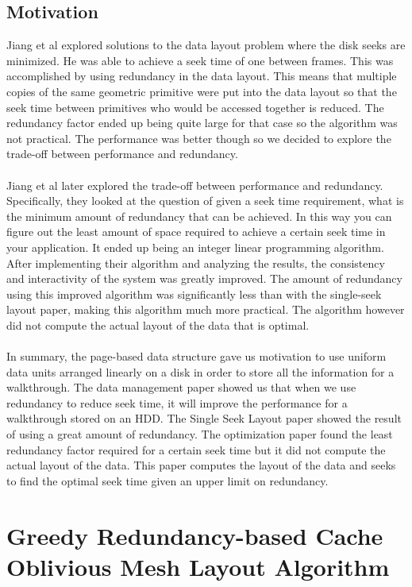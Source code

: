 \documentclass[11pt,psfig]{article}
\begin{document}
\subsection*{Motivation}

Jiang et al \cite{singleseeklayout} explored solutions to the data layout problem where the disk seeks are minimized. He was able to achieve a seek time of one between frames. This was accomplished by using redundancy in the data layout. This means that multiple copies of the same geometric primitive were put into the data layout so that the seek time between primitives who would be accessed together is reduced. The redundancy factor ended up being quite large for that case so the algorithm was not practical. The performance was better though so we decided to explore the trade-off between performance and redundancy. \\
\\
Jiang et al \cite{optimizingredundancy} later explored the trade-off between performance and redundancy. Specifically, they looked at the question of given a seek time requirement, what is the minimum amount of redundancy that can be achieved. In this way you can figure out the least amount of space required to achieve a certain seek time in your application. It ended up being an integer linear programming algorithm. After implementing their algorithm and analyzing the results, the consistency and interactivity of the system was greatly improved. The amount of redundancy using this improved algorithm was significantly less than with the single-seek layout paper, making this algorithm much more practical. The algorithm however did not compute the actual layout of the data that is optimal. \\
\\
In summary, the page-based data structure gave us motivation to use uniform data units arranged linearly on a disk in order to store all the information for a walkthrough. The data management paper showed us that when we use redundancy to reduce seek time, it will improve the performance for a walkthrough stored on an HDD. The Single Seek Layout paper showed the result of using a great amount of redundancy. The optimization paper found the least redundancy factor required for a certain seek time but it did not compute the actual layout of the data. This paper computes the layout of the data and seeks to find the optimal seek time given an upper limit on redundancy. 

\newpage

\section*{Greedy Redundancy-based Cache Oblivious Mesh Layout Algorithm}
\end{document}
